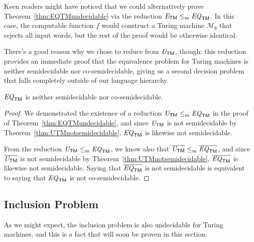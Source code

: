 Keen readers might have noticed that we could alternatively prove Theorem~\ref{thm:EQTMundecidable} via the reduction $\mathit{E}_{\textsf{TM}} \leq_{\mathrm{m}} \mathit{EQ}_{\textsf{TM}}$. In this case, the computable function $f$ would construct a Turing machine $\mathcal{M}_{\emptyset}$ that rejects all input words, but the rest of the proof would be otherwise identical.

There's a good reason why we chose to reduce from $\mathit{U}_{\textsf{TM}}$, though: this reduction provides an immediate proof that the equivalence problem for Turing machines is neither semidecidable nor co-semidecidable, giving us a second decision problem that falls completely outside of our language hierarchy.

\begin{theorem}\label{thm:EQTMnotsemidecidable}
$\mathit{EQ}_{\textsf{TM}}$ is neither semidecidable nor co-semidecidable.

\begin{proof}
We demonstrated the existence of a reduction $\mathit{U}_{\textsf{TM}} \leq_{\mathrm{m}} \mathit{EQ}_{\textsf{TM}}$ in the proof of Theorem~\ref{thm:EQTMundecidable}, and since $\mathit{U}_{\textsf{TM}}$ is not semidecidable by Theorem~\ref{thm:UTMnotsemidecidable}, $\mathit{EQ}_{\textsf{TM}}$ is likewise not semidecidable.

From the reduction $\mathit{U}_{\textsf{TM}} \leq_{\mathrm{m}} \mathit{EQ}_{\textsf{TM}}$, we know also that $\overline{\mathit{U}_{\textsf{TM}}} \leq_{\mathrm{m}} \overline{\mathit{EQ}_{\textsf{TM}}}$, and since $\overline{\mathit{U}_{\textsf{TM}}}$ is not semidecidable by Theorem~\ref{thm:UTMnotsemidecidable}, $\overline{\mathit{EQ}_{\textsf{TM}}}$ is likewise not semidecidable. Saying that $\overline{\mathit{EQ}_{\textsf{TM}}}$ is not semidecidable is equivalent to saying that $\mathit{EQ}_{\textsf{TM}}$ is not co-semidecidable.
\end{proof}
\end{theorem}

\subsection*{Inclusion Problem}

\begin{construction}
As we might expect, the inclusion problem is also undecidable for Turing machines, and this is a fact that will soon be proven in this section.
\end{construction}